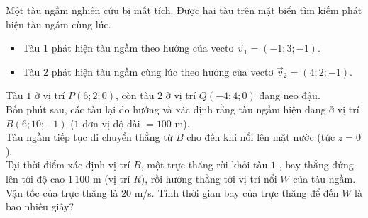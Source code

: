\begin{bt}%
	Một tàu ngầm nghiên cứu bị  mất tích. Được hai tàu trên mặt biển tìm kiếm phát hiện tàu ngầm cùng lúc.
	\begin{itemize}
		\item Tàu $1$ phát hiện  tàu ngầm theo hướng của vectơ $\overrightarrow{v}_1=(-1;3;-1)$.
		\item Tàu $2$ phát hiện tàu ngầm cùng lúc theo hướng của vectơ  $\overrightarrow{v}_2=(4; 2;-1)$.
	\end{itemize}
	Tàu  $1$ ở vị trí $P(6; 2; 0)$, còn tàu $2$ ở vị trí $Q(-4; 4; 0)$ đang neo đậu.\\
	Bốn phút sau, các tàu lại đo hướng và xác định rằng tàu ngầm hiện đang ở vị trí  $B(6; 10;-1)$ ($1$ đơn vị độ dài $=100$ m).\\
	Tàu ngầm tiếp tục di chuyển thẳng từ $B$ cho đến khi nổi lên mặt nước (tức  $z=0$).\\
	Tại thời  điểm xác định vị trí $B$, một trực thăng rời khỏi tàu $1$ , bay thẳng đứng lên tới độ cao $1\,100$ m (vị trí $R$), rồi hướng thẳng tới vị trí nổi $W$ của tàu ngầm. Vận tốc của trực thăng là $20$ m/s. Tính thời gian bay của trực thăng để đến $W$ là bao nhiêu giây?
\end{bt}
